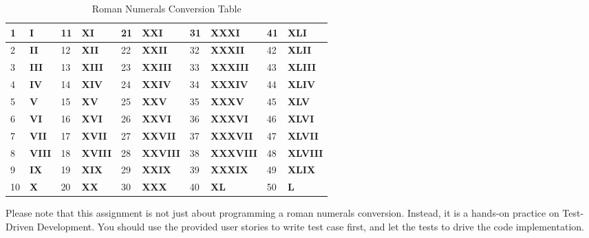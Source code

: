\begin{table}[!h]
\centering
\caption{Roman Numerals Conversion Table}  \begin{tabular}{|p{0.3cm}|p{1.2cm}||p{0.3cm}|p{1.2cm}||p{0.3cm}|p{1.2cm}||p{0.3cm}|p{1.2cm}||p{0.3cm}|p{1.2cm}|}
    \hline 1 & \textbf{I} & 11 & \textbf{XI} & 21 & \textbf{XXI} & 31
    & \textbf{XXXI} & 41 & \textbf{XLI} \\ \hline 2 & \textbf{II} & 12
    & \textbf{XII} & 22 & \textbf{XXII} & 32 & \textbf{XXXII} & 42 &
    \textbf{XLII} \\ \hline 3 & \textbf{III} & 13 & \textbf{XIII} & 23
    & \textbf{XXIII} & 33 & \textbf{XXXIII} & 43 & \textbf{XLIII} \\
    \hline 4 & \textbf{IV} & 14 & \textbf{XIV} & 24 & \textbf{XXIV} &
    34 & \textbf{XXXIV} & 44 & \textbf{XLIV} \\ \hline 5 & \textbf{V}
    & 15 & \textbf{XV} & 25 & \textbf{XXV} & 35 & \textbf{XXXV} & 45 &
    \textbf{XLV} \\ \hline 6 & \textbf{VI} & 16 & \textbf{XVI} & 26 &
    \textbf{XXVI} & 36 & \textbf{XXXVI} & 46 & \textbf{XLVI} \\ \hline
    7 & \textbf{VII} & 17 & \textbf{XVII} & 27 & \textbf{XXVII} & 37 &
    \textbf{XXXVII} & 47 & \textbf{XLVII} \\ \hline 8 & \textbf{VIII}
    & 18 & \textbf{XVIII} & 28 & \textbf{XXVIII} & 38 &
    \textbf{XXXVIII}& 48 & \textbf{XLVIII} \\ \hline 9 & \textbf{IX} &
    19 & \textbf{XIX} & 29 & \textbf{XXIX} & 39 & \textbf{XXXIX} & 49
    & \textbf{XLIX} \\ \hline 10 & \textbf{X} & 20 & \textbf{XX} & 30
    & \textbf{XXX} & 40 & \textbf{XL} & 50 & \textbf{L} \\ \hline
    \end{tabular}
    \label{tab:AppRomanNumeralTable}
\end{table}

Please note that this assignment is not just about programming a roman
numerals conversion. Instead, it is a hands-on practice on Test-Driven
Development. You should use the provided user stories to write test
case first, and let the tests to drive the code implementation. \\


